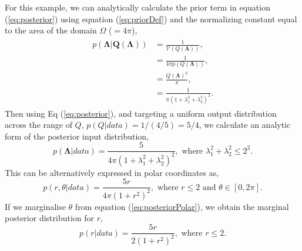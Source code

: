\documentclass[10pt,letterpaper]{article}
\newcommand{\R}{\mathbb{R}}
\begin{document}
For this example, we can analytically calculate the prior term in equation (\ref{eq:posterior}) using equation (\ref{eq:priorDef}) and the normalizing constant equal to the area of the domain $\Omega$ ($=4\pi$),
%
\begin{equation} \label{eq:prior_analytic}
\begin{gathered}\begin{aligned}
p(\boldsymbol{\Lambda}|\boldsymbol{Q}(\boldsymbol{\Lambda}))
&= \frac{1}{\mathcal{V}(Q(\boldsymbol{\Lambda}))}, \nonumber \\
&= \frac{1}{4\pi p(Q(\boldsymbol{\Lambda}))}, \nonumber \\
&= \frac{Q(\boldsymbol{\Lambda})^2}{\pi}, \nonumber \\
&= \frac{1}{\pi(1 + \lambda_1^2+\lambda_2^2)^2}.
\end{aligned}\end{gathered}
\end{equation}
%
Then using Eq (\ref{eq:posterior}), and targeting a uniform output distribution across the range of $Q$, $p(Q|data) = 1 / (4/5) = 5/4$, we calculate an analytic form of the posterior input distribution,
\begin{equation}
p(\boldsymbol{\Lambda}|data)  = \frac{5}{4\pi(1 + \lambda_1^2+\lambda_2^2)^2},
        \text{ where } \lambda_1^2 + \lambda_2^2 \leq 2^2.
\end{equation}
%
This can be alternatively expressed in polar coordinates as,
%
\begin{equation}\label{eq:posteriorPolar}
p(r,\theta|data) = \frac{5r}{4\pi (1+r^2)^2}, \text{ where } r \leq 2 \text{ and } \theta\in [0,2\pi].
\end{equation}
%
If we marginalise $\theta$ from equation (\ref{eq:posteriorPolar}), we obtain the marginal posterior distribution for $r$,
\begin{equation}\label{eq:posteriorPolarMarginal}
p(r|data) = \frac{5r}{2 (1+r^2)^2}, \text{ where } r \leq 2.
\end{equation}
%

\end{document}
